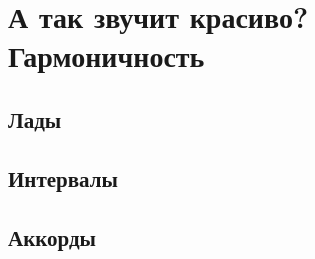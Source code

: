 \chapter{А так звучит красиво? Гармоничность}
\label{ch:harmony}

\section{Лады}
\label{sec:harmony:lad}

\section{Интервалы}
\label{sec:harmony:interval}

\section{Аккорды}
\label{sec:harmony:chords}
